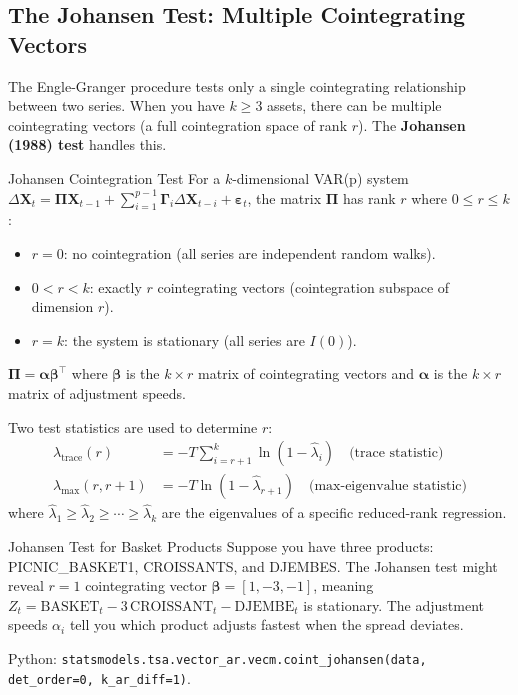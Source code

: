 \documentclass[12pt,a4paper,openany]{report}
\theoremstyle{definition}
\begin{document}
\subsection{The Johansen Test: Multiple Cointegrating Vectors}

The Engle-Granger procedure tests only a single cointegrating relationship between two series. When you have $k \geq 3$ assets, there can be multiple cointegrating vectors (a full cointegration space of rank $r$). The \textbf{Johansen (1988) test} handles this.

\begin{definitionbox}{Johansen Cointegration Test}
For a $k$-dimensional VAR(p) system $\Delta\mathbf{X}_t = \mathbf{\Pi}\mathbf{X}_{t-1} + \sum_{i=1}^{p-1}\mathbf{\Gamma}_i\Delta\mathbf{X}_{t-i} + \boldsymbol{\varepsilon}_t$, the matrix $\mathbf{\Pi}$ has rank $r$ where $0 \leq r \leq k$:
\begin{itemize}
  \item $r = 0$: no cointegration (all series are independent random walks).
  \item $0 < r < k$: exactly $r$ cointegrating vectors (cointegration subspace of dimension $r$).
  \item $r = k$: the system is stationary (all series are $I(0)$).
\end{itemize}
$\mathbf{\Pi} = \mathbf{\alpha}\mathbf{\beta}^{\top}$ where $\mathbf{\beta}$ is the $k \times r$ matrix of cointegrating vectors and $\mathbf{\alpha}$ is the $k \times r$ matrix of adjustment speeds.
\end{definitionbox}

Two test statistics are used to determine $r$:
\begin{align}
  \lambda_{\text{trace}}(r) &= -T\sum_{i=r+1}^{k}\ln(1-\hat{\lambda}_i) \quad \text{(trace statistic)} \\
  \lambda_{\max}(r, r+1) &= -T\ln(1-\hat{\lambda}_{r+1}) \quad \text{(max-eigenvalue statistic)}
\end{align}
where $\hat{\lambda}_1 \geq \hat{\lambda}_2 \geq \cdots \geq \hat{\lambda}_k$ are the eigenvalues of a specific reduced-rank regression.

\begin{examplebox}{Johansen Test for Basket Products}
Suppose you have three products: PICNIC\_BASKET1, CROISSANTS, and DJEMBES. The Johansen test might reveal $r = 1$ cointegrating vector $\mathbf{\beta} = [1, -3, -1]$, meaning $Z_t = \text{BASKET}_t - 3\,\text{CROISSANT}_t - \text{DJEMBE}_t$ is stationary. The adjustment speeds $\alpha_i$ tell you which product adjusts fastest when the spread deviates.

Python: \texttt{statsmodels.tsa.vector\_ar.vecm.coint\_johansen(data, det\_order=0, k\_ar\_diff=1)}.
\end{examplebox}
\end{document}
